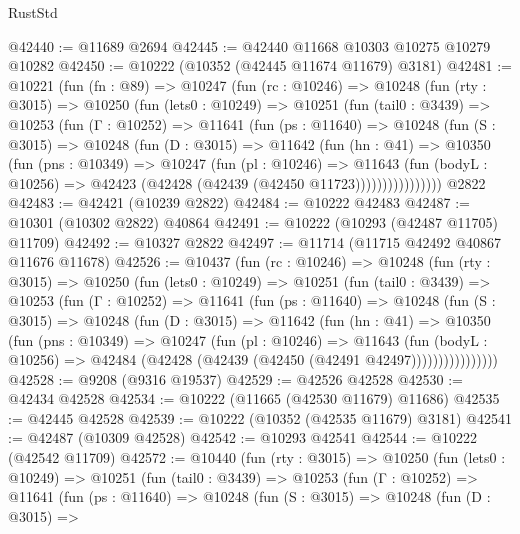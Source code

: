 \begin{lexlean}{RustStd}
\begin{coremodule}
@42440 := @11689 @2694
@42445 := @42440 @11668 @10303 @10275 @10279 @10282
@42450 := @10222 (@10352 (@42445 @11674 @11679) @3181)
@42481 := @10221
    (fun (fn : @89) =>
    @10247
      (fun (rc : @10246) =>
      @10248
        (fun (rty : @3015) =>
        @10250
          (fun (lets0 : @10249) =>
          @10251
            (fun (tail0 : @3439) =>
            @10253
              (fun (Γ : @10252) =>
              @11641
                (fun (ps : @11640) =>
                @10248
                  (fun (S : @3015) =>
                  @10248
                    (fun (D : @3015) =>
                    @11642
                      (fun (hn : @41) =>
                      @10350
                        (fun (pns : @10349) =>
                        @10247
                          (fun (pl : @10246) =>
                          @11643
                            (fun (bodyL : @10256) =>
                            @42423 (@42428 (@42439 (@42450 @11723))))))))))))))))
    @2822
@42483 := @42421 (@10239 @2822)
@42484 := @10222 @42483
@42487 := @10301 (@10302 @2822) @40864
@42491 := @10222 (@10293 (@42487 @11705) @11709)
@42492 := @10327 @2822
@42497 := @11714 (@11715 @42492 @40867 @11676 @11678)
@42526 := @10437
    (fun (rc : @10246) =>
    @10248
      (fun (rty : @3015) =>
      @10250
        (fun (lets0 : @10249) =>
        @10251
          (fun (tail0 : @3439) =>
          @10253
            (fun (Γ : @10252) =>
            @11641
              (fun (ps : @11640) =>
              @10248
                (fun (S : @3015) =>
                @10248
                  (fun (D : @3015) =>
                  @11642
                    (fun (hn : @41) =>
                    @10350
                      (fun (pns : @10349) =>
                      @10247
                        (fun (pl : @10246) =>
                        @11643
                          (fun (bodyL : @10256) =>
                          @42484 (@42428 (@42439 (@42450 (@42491 @42497))))))))))))))))
@42528 := @9208 (@9316 @19537)
@42529 := @42526 @42528
@42530 := @42434 @42528
@42534 := @10222 (@11665 (@42530 @11679) @11686)
@42535 := @42445 @42528
@42539 := @10222 (@10352 (@42535 @11679) @3181)
@42541 := @42487 (@10309 @42528)
@42542 := @10293 @42541
@42544 := @10222 (@42542 @11709)
@42572 := @10440
    (fun (rty : @3015) =>
    @10250
      (fun (lets0 : @10249) =>
      @10251
        (fun (tail0 : @3439) =>
        @10253
          (fun (Γ : @10252) =>
          @11641
            (fun (ps : @11640) =>
            @10248
              (fun (S : @3015) =>
              @10248
                (fun (D : @3015) =>

\end{coremodule}
\end{lexlean}
